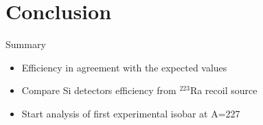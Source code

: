 \documentclass[10pt]{beamer}
\begin{document}
\section{Conclusion}
\begin{frame}{Summary}
	\centering
	\begin{itemize}
		\item Efficiency in agreement with the expected values
		\item Compare Si detectors efficiency from $^{223}$Ra recoil source
		\item Start analysis of first experimental isobar at A=227
		\
	\end{itemize}
\end{frame}

\end{document}
